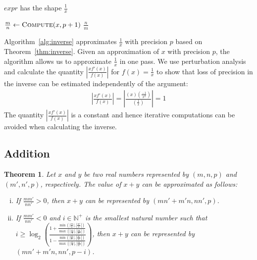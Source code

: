 \documentclass{article}
\newcommand{\nat}{\mathbb{N}}
\newtheorem{mytheorem}{Theorem}
\numberwithin{mytheorem}{section}
\begin{document}
\begin{algorithm}
\caption{Inverse}\label{alg:inverse}
\begin{algorithmic}[1]
\Require $expr$ has the shape $\frac{1}{x}$

\State $\frac{m}{n} \gets \Call{Compute}{x,p+1}$
\State \Return $\frac{n}{m}$
\EndProcedure
\end{algorithmic}
\end{algorithm} 


Algorithm~\ref{alg:inverse} approximates $\frac{1}{x}$ with precision $p$ based on Theorem~\ref{thm:inverse}. Given an approximation of $x$ with precision $p$, the algorithm allows us to approximate $\frac{1}{x}$ in one pass. We use perturbation analysis and calculate the quantity $|\frac{xf'(x)}{f(x)}|$ for $f(x)=\frac{1}{x}$ to show that loss of precision in the inverse can be estimated independently of the argument: 
\begin{align*}
|\frac{xf'(x)}{f(x)}|=|\frac{(x)(\frac{-1}{x^2})}{(\frac{1}{x})}|=1
\end{align*}
The quantity $|\frac{xf'(x)}{f(x)}|$ is a constant and hence iterative computations can be avoided when calculating the inverse. 



\subsection{Addition}\label{subsec:add}   
\begin{mytheorem}\label{thm:add}
Let $x$ and $y$ be two real numbers represented by $(m,n,p)$ and $(m',n',p)$, respectively. The value of $x+y$ can be approximated as follows:
\begin{enumerate}[i.]
\item \label{thm:add_same_sign}
If $\frac{mm'}{nn'}>0$, then $x+y$ can be represented by $(mn'+m'n,nn',p)$.
\item \label{thm:add_diff_sign}
If $\frac{mm'}{nn'}<0$ and $i\in \nat^+$ is the smallest natural number such that $i\geq \log_2(\frac{1+\frac{\min(|\frac{m}{n}|,|\frac{m'}{n'}|)}{\max(|\frac{m}{n}|,|\frac{m'}{n'}|)}}{1-\frac{\min(|\frac{m}{n}|,|\frac{m'}{n'}|)}{\max(|\frac{m}{n}|,|\frac{m'}{n'}|)}})$, then $x+y$ can be represented by $(mn'+m'n,nn',p-i)$.
\end{enumerate}
\end{mytheorem}
\end{document}
